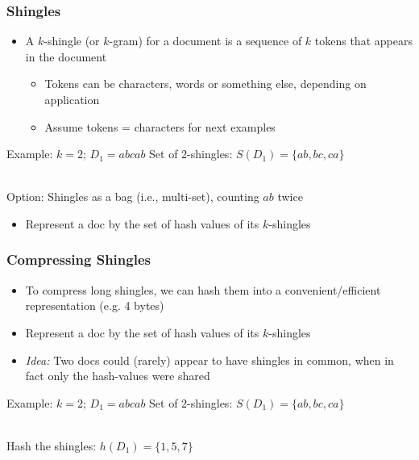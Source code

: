 \documentclass[svgnames]{beamer}
\begin{document}
\begin{frame} \frametitle{Shingles}

\begin{itemize}
\item A $k$-shingle (or $k$-gram) for a document is a sequence of $k$ tokens that appears in the document
  \begin{itemize}
  \item Tokens can be characters, words or something else, depending on application
  \item Assume tokens = characters for next examples
  \end{itemize}
\end{itemize}

\begin{block}{Example: $k=2$; $D_1=abcab$}
  Set of 2-shingles: $S(D_1)=\{ab, bc, ca\}$
  
  ~\\
  Option: Shingles as a bag (i.e., multi-set), counting $ab$ twice
\end{block}
\begin{itemize}
\item Represent a doc by the set of hash values of its $k$-shingles
\end{itemize}

\end{frame}

  
\begin{frame} \frametitle{Compressing Shingles}

\begin{itemize}
\item To compress long shingles, we can hash them into a convenient/efficient representation (e.g. 4 bytes)

\item Represent a doc by the set of hash values of its $k$-shingles

\item \emph{Idea:} Two docs could (rarely) appear to have shingles in common, when in fact only the hash-values were shared
\end{itemize}

\begin{block}{Example: $k=2$; $D_1=abcab$}
  Set of 2-shingles: $S(D_1)=\{ab, bc, ca\}$
  
  ~\\
  Hash the shingles: $h(D_1)=\{1, 5, 7\}$
\end{block}
\end{frame}
\end{document}
